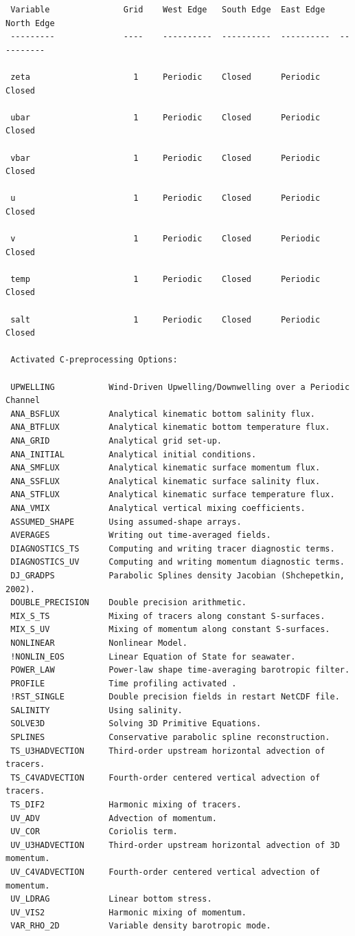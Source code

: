 \begin{verbatim}
 Variable               Grid    West Edge   South Edge  East Edge   North Edge
 ---------              ----    ----------  ----------  ----------  ----------

 zeta                     1     Periodic    Closed      Periodic    Closed

 ubar                     1     Periodic    Closed      Periodic    Closed

 vbar                     1     Periodic    Closed      Periodic    Closed

 u                        1     Periodic    Closed      Periodic    Closed

 v                        1     Periodic    Closed      Periodic    Closed

 temp                     1     Periodic    Closed      Periodic    Closed

 salt                     1     Periodic    Closed      Periodic    Closed

 Activated C-preprocessing Options:

 UPWELLING           Wind-Driven Upwelling/Downwelling over a Periodic Channel
 ANA_BSFLUX          Analytical kinematic bottom salinity flux.
 ANA_BTFLUX          Analytical kinematic bottom temperature flux.
 ANA_GRID            Analytical grid set-up.
 ANA_INITIAL         Analytical initial conditions.
 ANA_SMFLUX          Analytical kinematic surface momentum flux.
 ANA_SSFLUX          Analytical kinematic surface salinity flux.
 ANA_STFLUX          Analytical kinematic surface temperature flux.
 ANA_VMIX            Analytical vertical mixing coefficients.
 ASSUMED_SHAPE       Using assumed-shape arrays.
 AVERAGES            Writing out time-averaged fields.
 DIAGNOSTICS_TS      Computing and writing tracer diagnostic terms.
 DIAGNOSTICS_UV      Computing and writing momentum diagnostic terms.
 DJ_GRADPS           Parabolic Splines density Jacobian (Shchepetkin, 2002).
 DOUBLE_PRECISION    Double precision arithmetic.
 MIX_S_TS            Mixing of tracers along constant S-surfaces.
 MIX_S_UV            Mixing of momentum along constant S-surfaces.
 NONLINEAR           Nonlinear Model.
 !NONLIN_EOS         Linear Equation of State for seawater.
 POWER_LAW           Power-law shape time-averaging barotropic filter.
 PROFILE             Time profiling activated .
 !RST_SINGLE         Double precision fields in restart NetCDF file.
 SALINITY            Using salinity.
 SOLVE3D             Solving 3D Primitive Equations.
 SPLINES             Conservative parabolic spline reconstruction.
 TS_U3HADVECTION     Third-order upstream horizontal advection of tracers.
 TS_C4VADVECTION     Fourth-order centered vertical advection of tracers.
 TS_DIF2             Harmonic mixing of tracers.
 UV_ADV              Advection of momentum.
 UV_COR              Coriolis term.
 UV_U3HADVECTION     Third-order upstream horizontal advection of 3D momentum.
 UV_C4VADVECTION     Fourth-order centered vertical advection of momentum.
 UV_LDRAG            Linear bottom stress.
 UV_VIS2             Harmonic mixing of momentum.
 VAR_RHO_2D          Variable density barotropic mode.


\end{verbatim}
